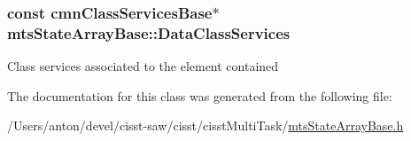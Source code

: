 \subsubsection[{Data\+Class\+Services}]{\setlength{\rightskip}{0pt plus 5cm}const {\bf cmn\+Class\+Services\+Base}$\ast$ mts\+State\+Array\+Base\+::\+Data\+Class\+Services\hspace{0.3cm}{\ttfamily [protected]}}\label{classmts_state_array_base_abd3be9ad51f2cb1930cddd78cc6f1216}
Class services associated to the element contained 

The documentation for this class was generated from the following file\+:\begin{DoxyCompactItemize}
\item 
/\+Users/anton/devel/cisst-\/saw/cisst/cisst\+Multi\+Task/\hyperlink{mts_state_array_base_8h}{mts\+State\+Array\+Base.\+h}\end{DoxyCompactItemize}
